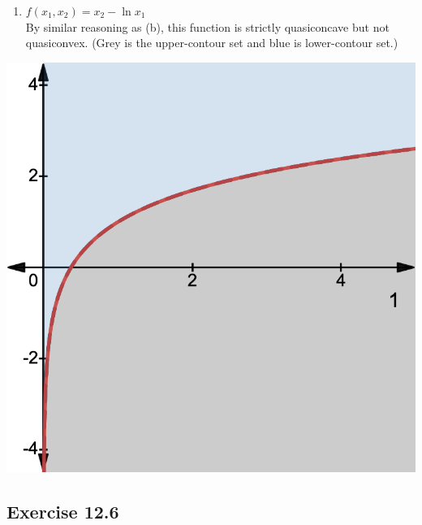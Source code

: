\documentclass{./../../Latex/homework}
\begin{document}
\begin{enumerate}
\begin{enumerate}
  \item $f\left(x_{1}, x_{2}\right)=x_{2}-\ln x_{1}$ \\
  By similar reasoning as (b), this function is strictly quasiconcave but not quasiconvex. (Grey is the upper-contour set and blue is lower-contour set.) 
\end{enumerate}
  \begin{center}
  	\includegraphics[scale=0.25]{3c.png}
  \end{center}
\end{enumerate}

\subsection*{Exercise 12.6} 
\end{document}

